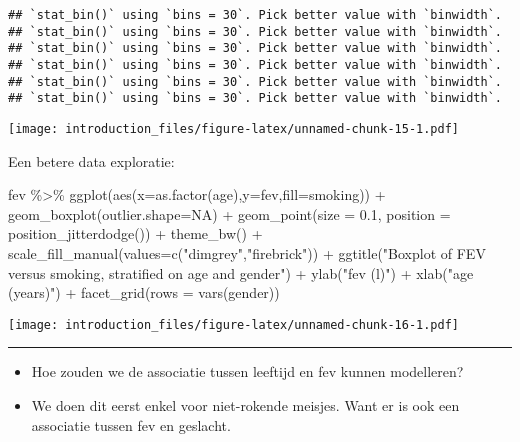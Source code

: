 \documentclass[
]{article}
\newenvironment{Shaded}{\begin{snugshade}}{\end{snugshade}}
\newcommand{\AttributeTok}[1]{\textcolor[rgb]{0.77,0.63,0.00}{#1}}
\newcommand{\ConstantTok}[1]{\textcolor[rgb]{0.00,0.00,0.00}{#1}}
\newcommand{\FloatTok}[1]{\textcolor[rgb]{0.00,0.00,0.81}{#1}}
\newcommand{\FunctionTok}[1]{\textcolor[rgb]{0.00,0.00,0.00}{#1}}
\newcommand{\NormalTok}[1]{#1}
\newcommand{\SpecialCharTok}[1]{\textcolor[rgb]{0.00,0.00,0.00}{#1}}
\newcommand{\StringTok}[1]{\textcolor[rgb]{0.31,0.60,0.02}{#1}}
\providecommand{\tightlist}{%
  \setlength{\itemsep}{0pt}\setlength{\parskip}{0pt}}
\begin{document}
\begin{verbatim}
## `stat_bin()` using `bins = 30`. Pick better value with `binwidth`.
## `stat_bin()` using `bins = 30`. Pick better value with `binwidth`.
## `stat_bin()` using `bins = 30`. Pick better value with `binwidth`.
## `stat_bin()` using `bins = 30`. Pick better value with `binwidth`.
## `stat_bin()` using `bins = 30`. Pick better value with `binwidth`.
## `stat_bin()` using `bins = 30`. Pick better value with `binwidth`.
\end{verbatim}

\texttt{[image: introduction\_files/figure-latex/unnamed-chunk-15-1.pdf]}

Een betere data exploratie:

\begin{Shaded}
\begin{Highlighting}[]
\NormalTok{fev }\SpecialCharTok{\%\textgreater{}\%}
  \FunctionTok{ggplot}\NormalTok{(}\FunctionTok{aes}\NormalTok{(}\AttributeTok{x=}\FunctionTok{as.factor}\NormalTok{(age),}\AttributeTok{y=}\NormalTok{fev,}\AttributeTok{fill=}\NormalTok{smoking)) }\SpecialCharTok{+}
  \FunctionTok{geom\_boxplot}\NormalTok{(}\AttributeTok{outlier.shape=}\ConstantTok{NA}\NormalTok{) }\SpecialCharTok{+}
  \FunctionTok{geom\_point}\NormalTok{(}\AttributeTok{size =} \FloatTok{0.1}\NormalTok{, }\AttributeTok{position =} \FunctionTok{position\_jitterdodge}\NormalTok{()) }\SpecialCharTok{+}
  \FunctionTok{theme\_bw}\NormalTok{() }\SpecialCharTok{+}
  \FunctionTok{scale\_fill\_manual}\NormalTok{(}\AttributeTok{values=}\FunctionTok{c}\NormalTok{(}\StringTok{"dimgrey"}\NormalTok{,}\StringTok{"firebrick"}\NormalTok{)) }\SpecialCharTok{+}
  \FunctionTok{ggtitle}\NormalTok{(}\StringTok{"Boxplot of FEV versus smoking, stratified on age and gender"}\NormalTok{) }\SpecialCharTok{+}
  \FunctionTok{ylab}\NormalTok{(}\StringTok{"fev (l)"}\NormalTok{) }\SpecialCharTok{+}
  \FunctionTok{xlab}\NormalTok{(}\StringTok{"age (years)"}\NormalTok{) }\SpecialCharTok{+} 
  \FunctionTok{facet\_grid}\NormalTok{(}\AttributeTok{rows =} \FunctionTok{vars}\NormalTok{(gender))}
\end{Highlighting}
\end{Shaded}

\texttt{[image: introduction\_files/figure-latex/unnamed-chunk-16-1.pdf]}

\begin{center}\rule{0.5\linewidth}{0.5pt}\end{center}

\begin{itemize}
\tightlist
\item
  Hoe zouden we de associatie tussen leeftijd en fev kunnen modelleren?
\item
  We doen dit eerst enkel voor niet-rokende meisjes. Want er is ook een
  associatie tussen fev en geslacht.
\end{itemize}
\end{document}
